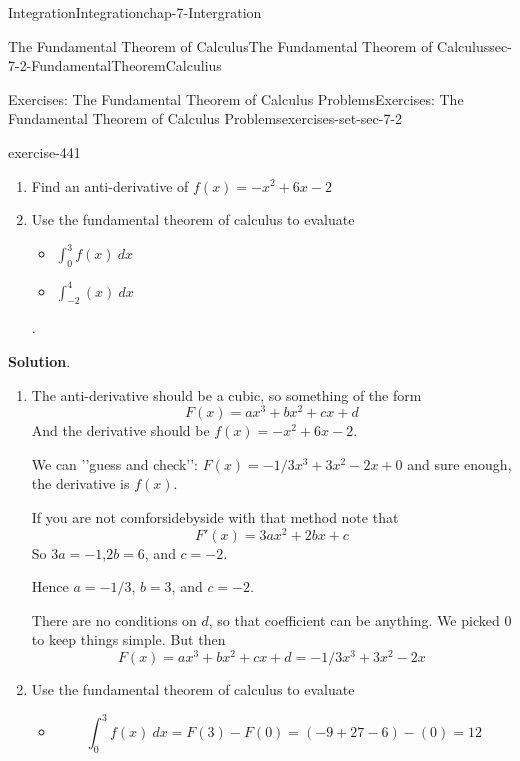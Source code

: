 \documentclass[oneside,10pt,]{book}
\numberwithin{equation}{section}
\begin{document}
\begin{chapterptx}{Integration}{}{Integration}{}{}{chap-7-Intergration}
\begin{sectionptx}{The Fundamental Theorem of Calculus}{}{The Fundamental Theorem of Calculus}{}{}{sec-7-2-FundamentalTheoremCalculius}
\begin{exercises-subsection-numberless}{Exercises: The Fundamental Theorem of Calculus Problems}{}{Exercises: The Fundamental Theorem of Calculus Problems}{}{}{exercises-set-sec-7-2}
\begin{divisionexercise}{7}{}{}{exercise-441}
\begin{enumerate}[label=(\alph*)]
\item\hypertarget{li-734}{}\hypertarget{p-2684}{}%
Find an anti-derivative of \(f(x)=-x^2+6x-2\)%
\item\hypertarget{li-735}{}\hypertarget{p-2685}{}%
Use the fundamental theorem of calculus to evaluate%
\begin{itemize}[label=\textbullet]
\item{}\(\int_0^3 f(x)\ dx\)%
\item{}\(\int_{-2}^4 (x)\ dx\)%
\end{itemize}
.%
\end{enumerate}
\par\smallskip%
\noindent\textbf{Solution}.\hypertarget{solution-223}{}\quad%
\leavevmode%
\begin{enumerate}[label=(\alph*)]
\item\hypertarget{li-738}{}\hypertarget{p-2686}{}%
The anti-derivative should be a cubic, so something of the form%
%
\begin{equation*}
F(x)=ax^3+bx^2+cx+d
\end{equation*}
\hypertarget{p-2687}{}%
And the derivative should be \(f(x)= -x^2+6x-2\).%
\par
\hypertarget{p-2688}{}%
We can '{}'{}guess and check'{}'{}: \(F(x)=-1/3 x^3+3x^2-2x+0\) and sure enough, the derivative is \(f(x)\).%
\par
\hypertarget{p-2689}{}%
If you are not comforsidebyside with that method note that%
%
\begin{equation*}
F' (x)=3ax^2+2bx+c
\end{equation*}
\hypertarget{p-2690}{}%
So \(3a= -1\),\(2b=6\), and \(c=-2\).%
\par
\hypertarget{p-2691}{}%
Hence \(a= -1/3\),   \(b=3\), and \(c=-2\).%
\par
\hypertarget{p-2692}{}%
There are no conditions on \(d\), so that coefficient can be anything. We picked 0 to keep things simple. But then%
%
\begin{equation*}
F(x)=ax^3+bx^2+cx+d=-1/3 x^3+3x^2-2x
\end{equation*}
\item\hypertarget{li-739}{}\hypertarget{p-2693}{}%
Use the fundamental theorem of calculus to evaluate%
\begin{itemize}[label=\textbullet]
\item{}%
\begin{equation*}
\int_0^3 f(x)\ dx=F(3)-F(0)=(-9+27-6)-(0)= 12
\end{equation*}

\end{itemize}
\end{enumerate}
\end{divisionexercise}
\end{exercises-subsection-numberless}
\end{sectionptx}
\end{chapterptx}
\end{document}
